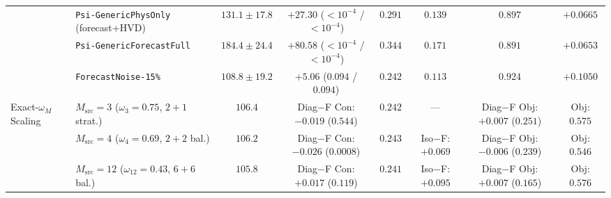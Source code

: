 \begin{table}[htbp]
{\begin{tabular}{llcccccc}
 & \texttt{Psi-GenericPhysOnly} (forecast+HVD) & $131.1\pm17.8$ & $+27.30$ ($<10^{-4}$ / $<10^{-4}$) & $0.291$ & $0.139$ & $0.897$ & $+0.0665$ \\
 & \texttt{Psi-GenericForecastFull} & $184.4\pm24.4$ & $+80.58$ ($<10^{-4}$ / $<10^{-4}$) & $0.344$ & $0.171$ & $0.891$ & $+0.0653$ \\
 & \texttt{ForecastNoise-15\%} & $108.8\pm19.2$ & $+5.06$ ($0.094$ / $0.094$) & $0.242$ & $0.113$ & $0.924$ & $+0.1050$ \\
\cmidrule(lr){1-8}
Exact-$\omega_M$ Scaling & $M_{\mathrm{src}}=3$ ($\omega_3\!=\!0.75$, $2\!+\!1$ strat.) & $106.4$ & Diag$-$F Con: $-0.019$ ($0.544$) & $0.242$ & --- & Diag$-$F Obj: $+0.007$ ($0.251$) & Obj: $0.575$ \\
 & $M_{\mathrm{src}}=4$ ($\omega_4\!=\!0.69$, $2\!+\!2$ bal.) & $106.2$ & Diag$-$F Con: $-0.026$ ($0.0008$) & $0.243$ & Iso$-$F: $+0.069$ & Diag$-$F Obj: $-0.006$ ($0.239$) & Obj: $0.546$ \\
 & $M_{\mathrm{src}}=12$ ($\omega_{12}\!=\!0.43$, $6\!+\!6$ bal.) & $105.8$ & Diag$-$F Con: $+0.017$ ($0.119$) & $0.241$ & Iso$-$F: $+0.095$ & Diag$-$F Obj: $+0.007$ ($0.165$) & Obj: $0.576$ \\
\bottomrule
\end{tabular}%
}
\end{table}

